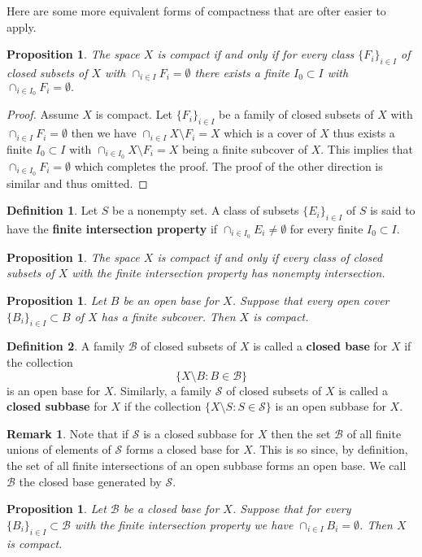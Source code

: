 \documentclass[11pt,a4paper]{article}
\theoremstyle{definition}
\newtheorem{definition}{Definition}[section]
\newtheorem{remark}{Remark}[section]
\theoremstyle{plain}
\newtheorem{proposition}[theorem]{Proposition}
\begin{document}
	Here are some more equivalent forms of compactness that are ofter easier
	to apply.
	\begin{proposition}
		The space $X$ is compact if and only if for every class 
		$\{F_i\}_{i \in I}$ of closed subsets of $X$ with 
		$\cap_{i \in I}{F_i} = \emptyset$ there exists a finite 
		$I_0 \subset I$ with $\cap_{i \in I_0} {F_i} = \emptyset.$
	\end{proposition}
	\begin{proof}
		Assume $X$ is compact. Let $\{F_i\}_{i \in I}$ be a family of closed 
		subsets of $X$ with $\cap_{i \in I}{F_i} = \emptyset$ then 
		we have
		$\cap_{i \in I} {X \setminus F_i} = X$ which is a cover of $X$
		thus exists a finite $I_0 \subset I$ with 
		$\cap_{i \in I_0} {X \setminus F_i} = X$ being a finite subcover
		of $X$. This implies that $\cap_{i \in I_0} {F_i} = \emptyset$
		which completes the proof. The proof of the other direction is
		similar and thus omitted. 
	\end{proof}
	\begin{definition}
		Let $S$ be a nonempty set. A class of subsets $\{E_i\}_{i \in I}$ of 
		$S$ is said to have the \textbf{finite intersection property} if 
		$\cap_{i \in I_0}{E_i} \neq \emptyset$ for every finite 
		$I_0 \subset I$.
	\end{definition}
	\begin{proposition}
		The space $X$ is compact if and only if every class of closed
		subsets of $X$ with the finite intersection property has nonempty 
		intersection.
	\end{proposition}
	\begin{proposition}
		Let $B$ be an open base for $X$. Suppose that every open cover
		$\{B_i\}_{i \in I} \subset B$ of $X$ has a finite subcover. Then $X$ 
		is compact.
	\end{proposition}
	\begin{definition}
		A family $\mathcal{B}$ of closed subsets of $X$ is called a 
		\textbf{closed base} for $X$ if the collection
		\[
			\{X \setminus B \colon B \in \mathcal{B}\}
		\]
		is an open base for $X$. Similarly, a family $\mathcal{S}$ of
		closed subsets of $X$ is called a \textbf{closed subbase} for $X$ 
		if the collection $\{X \setminus S \colon S \in \mathcal{S}\}$ is 
		an open subbase for $X$.
	\end{definition}
	\begin{remark}
		Note that if $\mathcal{S}$ is a closed subbase for $X$ then the set 
		$\mathcal{B}$ of all finite unions of elements of $\mathcal{S}$ forms 
		a closed base for $X$. This is so since, by definition,
		the set of all finite intersections of an open subbase forms an open 
		base. We call $\mathcal{B}$ the closed base generated by 
		$\mathcal{S}$.
	\end{remark}
	\begin{proposition}
		Let $\mathcal{B}$ be a closed base for $X$. Suppose that for every 
		$\{B_i\}_{i \in I} \subset \mathcal{B}$ with the finite intersection 
		property we have $\cap_{i \in I}{B_i} = \emptyset$. Then $X$ is 
		compact.
	\end{proposition}
	
\end{document}
